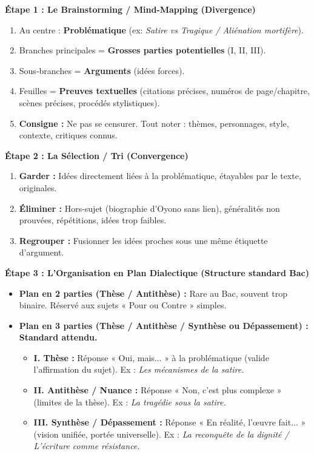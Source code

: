 \documentclass[11pt]{article}
\begin{document}
\begin{methode}
\textbf{Étape 1 : Le Brainstorming / Mind-Mapping (Divergence)}
\begin{enumerate}
    \item Au centre : \textbf{Problématique} (ex: \emph{Satire vs Tragique / Aliénation mortifère}).
    \item Branches principales = \textbf{Grosses parties potentielles} (I, II, III).
    \item Sous-branches = \textbf{Arguments} (idées forces).
    \item Feuilles = \textbf{Preuves textuelles} (citations précises, numéros de page/chapitre, scènes précises, procédés stylistiques).
    \item \textbf{Consigne :} Ne pas se censurer. Tout noter : thèmes, personnages, style, contexte, critiques connus.
\end{enumerate}

\textbf{Étape 2 : La Sélection / Tri (Convergence)}
\begin{enumerate}
    \item \textbf{Garder :} Idées directement liées à la problématique, étayables par le texte, originales.
    \item \textbf{Éliminer :} Hors-sujet (biographie d'Oyono sans lien), généralités non prouvées, répétitions, idées trop faibles.
    \item \textbf{Regrouper :} Fusionner les idées proches sous une même étiquette d'argument.
\end{enumerate}

\textbf{Étape 3 : L'Organisation en Plan Dialectique (Structure standard Bac)}
\begin{itemize}
    \item \textbf{Plan en 2 parties (Thèse / Antithèse) :} Rare au Bac, souvent trop binaire. Réservé aux sujets « Pour ou Contre » simples.
    \item \textbf{Plan en 3 parties (Thèse / Antithèse / Synthèse ou Dépassement) :} \textbf{Standard attendu.}
    \begin{itemize}
        \item \textbf{I. Thèse :} Réponse « Oui, mais... » à la problématique (valide l'affirmation du sujet). Ex : \emph{Les mécanismes de la satire.}
        \item \textbf{II. Antithèse / Nuance :} Réponse « Non, c'est plus complexe » (limites de la thèse). Ex : \emph{La tragédie sous la satire.}
        \item \textbf{III. Synthèse / Dépassement :} Réponse « En réalité, l'œuvre fait... » (vision unifiée, portée universelle). Ex : \emph{La reconquête de la dignité / L'écriture comme résistance.}
    \end{itemize}
\end{itemize}


\end{methode}
\end{document}
